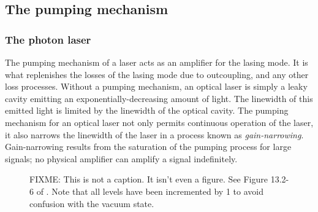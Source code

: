 % 
% 

\subsection{The pumping mechanism}

\subsubsection{The photon laser}

The pumping mechanism of a laser acts as an amplifier for the lasing mode.  It is what replenishes the losses of the lasing mode due to outcoupling, and any other loss processes.  Without a pumping mechanism, an optical laser is simply a leaky cavity emitting an exponentially-decreasing amount of light.  The linewidth of this emitted light is limited by the linewidth of the optical cavity.  The pumping mechanism for an optical laser not only permits continuous operation of the laser, it also narrows the linewidth of the laser in a process known as \emph{gain-narrowing}.  Gain-narrowing results from the saturation of the pumping process for large signals; no physical amplifier can amplify a signal indefinitely.  

\begin{figure}
    \centering
    \caption{
        \label{Introduction:4LevelOpticalLaserModel}
        FIXME: This is not a caption.  It isn't even a figure.  See Figure 13.2-6 of \citep{SalehTeich}.  Note that all levels have been incremented by 1 to avoid confusion with the vacuum state.
    }
\end{figure}


